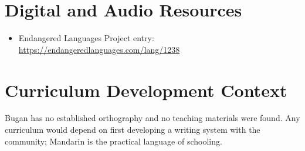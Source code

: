 \documentclass[12pt]{article}
\begin{document}
\section{Digital and Audio Resources}
\begin{itemize}
\item Endangered Languages Project entry: \url{https://endangeredlanguages.com/lang/1238}
\end{itemize}

\section{Curriculum Development Context}
Bugan has no established orthography and no teaching materials were found. Any curriculum would depend on first developing a writing system with the community; Mandarin is the practical language of schooling.
\end{document}
